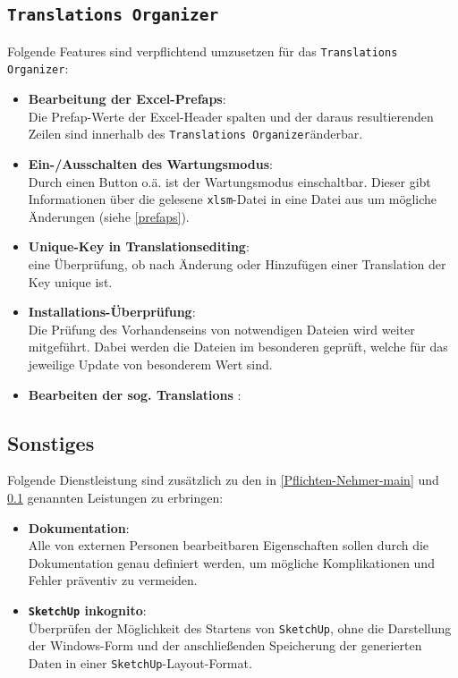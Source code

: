 \documentclass[a4paper,12pt]{article}
\newcommand{\assisttool}{\texttt{Translations Organizer}}
\newcommand{\sketchup}{\texttt{SketchUp}\xspace}
\begin{document}
		\subsection{\assisttool} \label{Pflichten-Nehmer-assist}
			Folgende Features sind verpflichtend umzusetzen für das \assisttool:
			\begin{itemize}
				\item \textbf{Bearbeitung der Excel-Prefaps}: \label{prefaps}\\
					Die Prefap-Werte der Excel-Header spalten und der daraus resultierenden Zeilen sind innerhalb des \assisttool änderbar.
				\item \textbf{Ein-/Ausschalten des Wartungsmodus}: \label{wartungsmodus}\\
					Durch einen Button o.ä. ist der Wartungsmodus einschaltbar. Dieser gibt Informationen über die gelesene \texttt{xlsm}-Datei in eine Datei aus um mögliche Änderungen (siehe \ref{prefaps}).
				\item \textbf{Unique-Key in Translationsediting}: \label{unique key}\\
					eine Überprüfung, ob nach Änderung oder Hinzufügen einer Translation der Key \glqq unique \grqq ist.
				\item \textbf{Installations-Überprüfung}: \label{installations ueberpruefung}\\
					Die Prüfung des Vorhandenseins von notwendigen Dateien wird weiter mitgeführt. Dabei werden die Dateien im besonderen geprüft, welche für das jeweilige Update von besonderem Wert sind.
				\item \textbf{Bearbeiten der sog. \glqq Translations \grqq}: \label{translations}
			\end{itemize}
		\subsection{Sonstiges} \label{Pflichten-sonstiges}
			Folgende Dienstleistung sind zusätzlich zu den in \ref{Pflichten-Nehmer-main} und \ref{Pflichten-Nehmer-assist} genannten Leistungen zu erbringen:
			\begin{itemize}
				\item \textbf{Dokumentation}: \\
					Alle von externen Personen bearbeitbaren Eigenschaften sollen durch die Dokumentation genau definiert werden, um mögliche Komplikationen und Fehler präventiv zu vermeiden.
				\item \textbf{\sketchup inkognito}: \label{incognito}\\
					Überprüfen der Möglichkeit des Startens von \sketchup, ohne die Darstellung der Windows-Form und der anschließenden Speicherung der generierten Daten in einer \sketchup-Layout-Format.
			\end{itemize}
\end{document}
